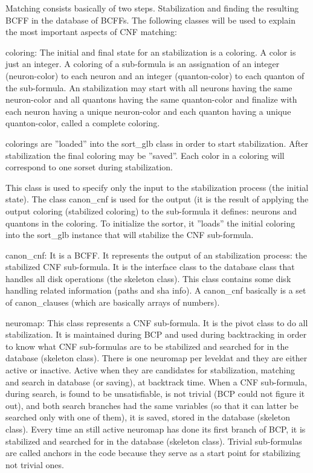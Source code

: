 \documentclass{easychair}
\newcommand{\neuron}{\textsf{neuron}}
\newcommand{\quanton}{\textsf{quanton}}
\newcommand{\leveldat}{\textsf{leveldat}}
\newcommand{\sortglb}{\textsf{sort\_glb}}
\newcommand{\sorset}{\textsf{sorset}}
\newcommand{\coloring}{\textsf{coloring}}
\newcommand{\canoncnf}{\textsf{canon\_cnf}}
\newcommand{\canonclause}{\textsf{canon\_clause}}
\newcommand{\neuromap}{\textsf{neuromap}}
\newcommand{\skeleton}{\textsf{skeleton}}
\begin{document}
Matching consists basically of two steps. Stabilization and finding the resulting BCFF in the database of BCFFs. The following classes will be used to explain the most important aspects of CNF matching:

{\coloring}: The initial and final state for an stabilization is a {\coloring}. A color is just an integer. A {\coloring} of a sub-formula is an assignation of an integer ({\neuron}-color) to each {\neuron} and an integer ({\quanton}-color) to each {\quanton} of the sub-formula. An stabilization may start with all {\neuron}s having the same {\neuron}-color and all {\quanton}s having the same {\quanton}-color and finalize with each {\neuron} having a unique {\neuron}-color and each {\quanton} having a unique {\quanton}-color, called a complete {\coloring}. 

{\coloring}s are ''loaded'' into the {\sortglb} class in order to start stabilization. After stabilization the final {\coloring} may be ''saved''. Each color in a coloring will correspond to one {\sorset} during stabilization.

This class is used to specify only the input to the stabilization process (the initial state). The class {\canoncnf} is used for the output (it is the result of applying the output {\coloring} (stabilized {\coloring}) to the sub-formula it defines: {\neuron}s and {\quanton}s in the {\coloring}. To initialize the sortor, it ''loads'' the initial {\coloring} into the {\sortglb} instance that will stabilize the CNF sub-formula.

{\canoncnf}: It is a BCFF. It represents the output of an stabilization process: the stabilized CNF sub-formula. It is the interface class to the database class that handles all disk operations (the {\skeleton} class). This class contains some disk handling related information (paths and sha info). A {\canoncnf} basically is a set of {\canonclause}s (which are basically arrays of numbers).

{\neuromap}: This class represents a CNF sub-formula. It is the pivot class to do all stabilization. It is maintained during BCP and used during backtracking in order to know what CNF sub-formulas are to be stabilized and searched for in the database ({\skeleton} class). There is one {\neuromap} per {\leveldat} and they are either active or inactive. Active when they are candidates for stabilization, matching and search in database (or saving), at backtrack time. When a CNF  sub-formula, during search, is found to be unsatisfiable, is not trivial (BCP could not figure it out), and both search branches had the same variables (so that it can latter be searched only with one of them), it is saved, stored in the database ({\skeleton} class). Every time an still active {\neuromap} has done its first branch of BCP, it is stabilized and searched for in the database ({\skeleton} class). Trivial sub-formulas are called anchors in the code because they serve as a start point for stabilizing not trivial ones. 
\end{document}
